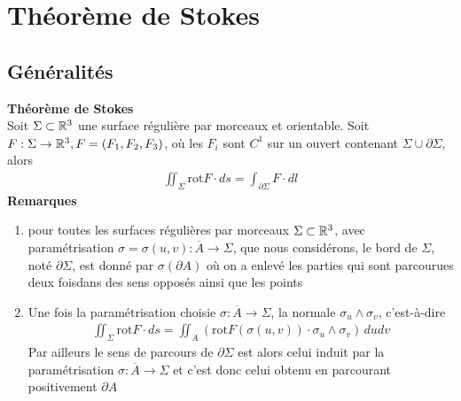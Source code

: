 \chapter[Théorème de Stokes]{Théorème de Stokes}

\section{Généralités}

\begin{myTheorem} {\bf Théorème de Stokes}
	\\Soit $\Sigma\subset\mathbb{R}^3$ une surface régulière par morceaux et orientable. Soit $F:\Sigma\rightarrow\mathbb{R}^3,F=(F_1,F_2,F_3)$, où les $F_i$ sont $C^1$ sur un ouvert contenant $\Sigma\cup\partial\Sigma$, alors
	\begin{eqnarray*}
		\iint_\Sigma \mathrm{rot}F\cdot ds=\int_{\partial\Sigma} F\cdot dl
	\end{eqnarray*}
	{\bf Remarques}
	\begin{enumerate}
		\item pour toutes les surfaces régulières par morceaux $\Sigma \subset\mathbb{R}^3$, avec paramétrisation $\sigma=\sigma(u,v):\overline{A}\rightarrow\Sigma$, que nous considérons, le bord de $\Sigma$, noté $\partial\Sigma$, est donné par $\sigma(\partial A)$ où on a enlevé les parties qui sont parcourues deux foisdans des sens opposés ainsi que les points
		\item Une fois la paramétrisation choisie $\sigma:\overline{A}\rightarrow\Sigma$, la normale $\sigma_u\wedge\sigma_v$, c'est-à-dire
		\begin{eqnarray*}
			\iint_\Sigma \mathrm{rot}F\cdot ds=\iint_A (\mathrm{rot}F(\sigma(u,v))\cdot\sigma_u\wedge\sigma_v)\,dudv
		\end{eqnarray*}
		Par ailleurs le sens de parcours de $\partial\Sigma$ est alors celui induit par la paramétrisation $\sigma:\overline{A}\rightarrow\Sigma$ et c'est donc celui obtenu en parcourant positivement $\partial A$
	\end{enumerate}
\end{myTheorem}

